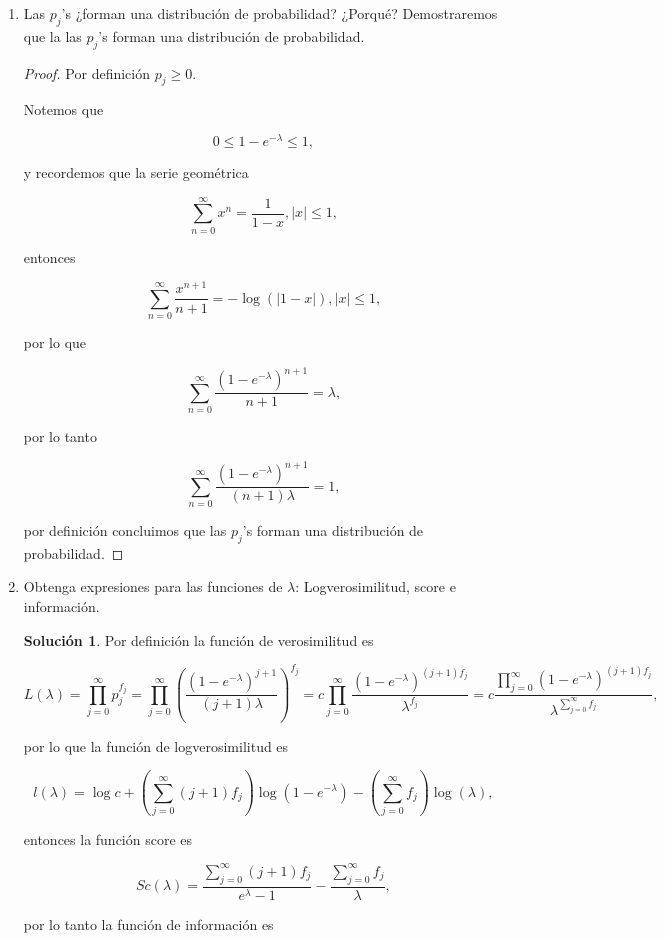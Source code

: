 \documentclass[letterpaper]{article}
\theoremstyle{definition}
\theoremstyle{lemathm}
\theoremstyle{lemathm}
\newtheorem{sol}{Solución}
\theoremstyle{lemathm}
\theoremstyle{lemademthm}
\newcommand{\abs}[1]{\left| #1 \right| }
\newcommand{\pars}[1]{\left( #1 \right) }
\newcommand{\1}{\mathbbm{1}}
\begin{document}
	\begin{enumerate}
		\item Las $p_j$'s ¿forman una distribución de probabilidad? ¿Porqué?
		Demostraremos que la las $p_j$'s forman una distribución de probabilidad.
		\begin{proof}
			Por definición $p_j\geq 0$.

			Notemos que

			\[0 \leq 1-e^{-\lambda} \leq 1,\]

			y recordemos que la serie geométrica

			\[\sum_{n=0}^\infty x^n = \frac{1}{1-x}, \abs{x}\leq 1,\]

			entonces

			\[\sum_{n=0}^\infty \frac{x^{n+1}}{n+1} = -\log\pars{\abs{1-x}}, \abs{x}\leq 1,\]

			por lo que 

			\[\sum_{n=0}^\infty \frac{\pars{1-e^{-\lambda}}^{n+1}}{n+1} = \lambda,\]

			por lo tanto

			\[\sum_{n=0}^\infty \frac{\pars{1-e^{-\lambda}}^{n+1}}{\pars{n+1}\lambda} = 1,\]

			por definición concluimos que las $p_j$'s forman una distribución de probabilidad.
		\end{proof}

		\item Obtenga expresiones para las funciones de $\lambda$: Logverosimilitud, score e información.
		\begin{sol}
			Por definición la función de verosimilitud es

			\[L\pars{\lambda} = \prod_{j=0}^{\infty}p_j^{f_j} = \prod_{j=0}^{\infty}\pars{\frac{\pars{1-e^{-\lambda}}^{j+1}}{\pars{j+1}\lambda}}^{f_j} = c\prod_{j=0}^{\infty}\frac{\pars{1-e^{-\lambda}}^{\pars{j+1}f_j}}{\lambda^{f_j}} = c\frac{\prod_{j=0}^{\infty}\pars{1-e^{-\lambda}}^{\pars{j+1}f_j}}{\lambda^{\sum_{j=0}^{\infty}f_j}},\]

			por lo que la función de logverosimilitud es

			\[l\pars{\lambda} = \log{c} + \pars{\sum_{j=0}^{\infty}\pars{j+1}f_j}\log\pars{1-e^{-\lambda}} - \pars{\sum_{j=0}^{\infty}f_j}\log\pars{\lambda},\]

			entonces la función score es

			\[Sc\pars{\lambda} = \frac{\sum_{j=0}^{\infty}\pars{j+1}f_j}{e^{\lambda}-1} - \frac{\sum_{j=0}^{\infty}f_j}{\lambda},\]

			por lo tanto la función de información es


\end{sol}
\end{enumerate}
\end{document}
